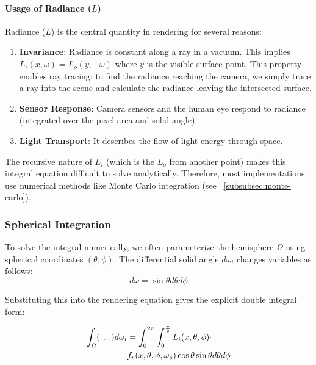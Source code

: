 \paragraph{Usage of Radiance ($L$)}

Radiance ($L$) is the central quantity in rendering for several reasons:
\begin{enumerate}
    \item \textbf{Invariance}: Radiance is constant along a ray in a vacuum.
    This implies $L_i(x, \omega) = L_o(y, -\omega)$ where $y$ is the visible surface point.
    This property enables ray tracing: to find the radiance reaching the camera,
    we simply trace a ray into the scene and calculate the radiance leaving the intersected surface.
    \item \textbf{Sensor Response}: Camera sensors and the human eye respond to radiance
    (integrated over the pixel area and solid angle).
    \item \textbf{Light Transport}: It describes the flow of light energy through space.
\end{enumerate}

The recursive nature of $L_i$ (which is the $L_o$ from another point)
makes this integral equation difficult to solve analytically.
Therefore, most implementations use numerical methods like Monte Carlo integration (see ~\ref{subsubsec:monte-carlo}).

\subsubsection{Spherical Integration}

To solve the integral numerically, we often parameterize the hemisphere $\Omega$
using spherical coordinates $(\theta, \phi)$.
The differential solid angle $d\omega_i$ changes variables as follows:
\begin{equation}
    d\omega = \sin\theta d\theta d\phi\label{eq:omega-cov}
\end{equation}

Substituting this into the rendering equation gives the explicit double integral form:

\begin{align}
    \int_{\Omega} (\dots) d\omega_i &= \int_{0}^{2\pi} \int_{0}^{\frac{\pi}{2}} L_i(x, \theta, \phi) \cdot \notag \\
    & f_r(x, \theta, \phi, \omega_o) \cos\theta \sin\theta d\theta d\phi
\end{align}

